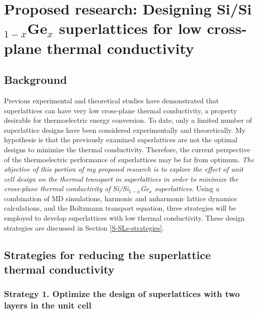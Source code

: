 \documentclass[letterpaper,12pt]{article}
\begin{document}
\clearpage

\section{\label{S-ProposedWorkSLs}Proposed research: Designing Si/Si$_{1-x}$Ge$_x$ superlattices for low cross-plane thermal conductivity}

\subsection{\label{S-SLs-background}Background}

Previous experimental and theoretical studies have demonstrated that
superlattices can have very low cross-plane thermal conductivity, a
property desirable for thermoelectric energy conversion. To date,
only a limited number of superlattice designs have been considered
experimentally and theoretically. My hypothesis is that the
previously examined superlattices are not the optimal designs to
minimize the thermal conductivity. Therefore, the current
perspective of the thermoelectric performance of superlattices may
be far from optimum. \textit{The objective of this portion of my
proposed research is to explore the effect of unit cell design on
the thermal transport in superlattices in order to minimize the
cross-plane thermal conductivity of Si/Si$_{1-x}$Ge$_x$
superlattices.} Using a combination of MD simulations, harmonic and
anharmonic lattice dynamics calculations, and the Boltzmann
transport equation, three strategies will be employed to develop
superlattices with low thermal conductivity. These design strategies
are discussed in Section \ref{S-SLs-strategies}.

\subsection{\label{S-SLs-strategies}Strategies for reducing the superlattice thermal conductivity}

\subsubsection*{Strategy 1. Optimize the design of
superlattices with two layers in the unit cell}

\end{document}
